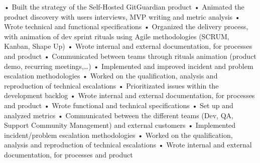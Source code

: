 \documentclass[
	a4paper,
]{fortysecondscv}
\begin{document}
\makefrontsidebar

\begin{cvtable}[3]
        {
			• Built the strategy of the Self-Hosted GitGuardian product\newline
			• Animated the product discovery with users interviews, MVP writing
			and metric analysis\newline
			• Wrote technical and functional specifications\newline
			• Organized the delivery process, with animation of dev sprint rituals using Agile methodologies (SCRUM, Kanban, Shape Up)\newline
			• Wrote internal and external documentation, for processes and product\newline
			• Communicated between teams through rituals animation (product demo, recurring meetings,…)\newline
		}
        {
			• Implemented and improved incident and problem escalation 
			methodologies\newline
			• Worked on the qualification, analysis and reproduction of 
			technical escalations\newline
			• Prioritizated issues within the development backlog\newline
			• Wrote internal and external documentation, for processes and 
			product\newline
			• Wrote functional and technical specifications\newline
			• Set up and analyzed metrics\newline
			• Communicated between the different teams (Dev, QA, Support 
			Community Management) and external customers\newline
        }
        {
            • Implemented incident/problem escalation methodologies\newline
			• Worked on the qualification, analysis and reproduction of 
			technical escalations\newline
			• Wrote internal and external documentation, for processes and 
			product\newline
}
\end{cvtable}
\end{document}

